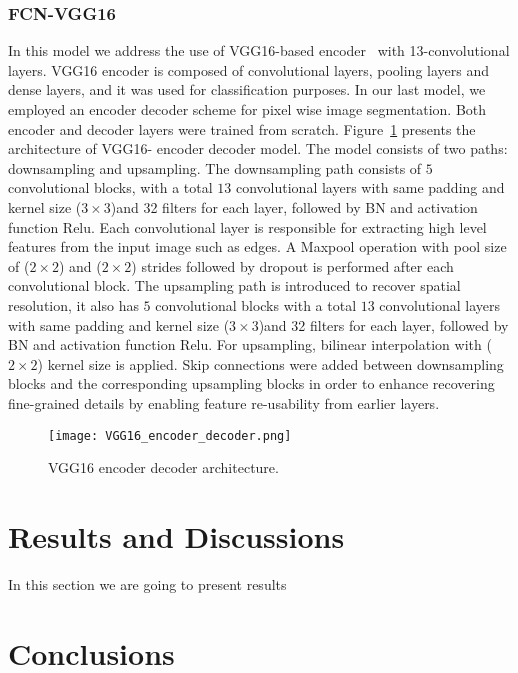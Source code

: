 \documentclass[preprint,9pt]{elsarticle}
\begin{document}
	\subsubsection{FCN-VGG16}
	In this model we address the use of VGG16-based encoder~\cite{Simonyan2015} with 13-convolutional layers.
	VGG16 encoder is composed of convolutional layers, pooling layers and dense layers, and it was used for classification purposes. 
	In our last model, we employed an encoder decoder scheme for pixel wise image segmentation. 
	Both encoder and decoder layers were trained from scratch.
	Figure~\ref{vgg16} presents the architecture of VGG16- encoder decoder model. 
	The model consists of two paths: downsampling and upsampling.
	The downsampling path consists of \(5\) convolutional blocks,  with a total \(13\) convolutional layers  with same padding and kernel size (\(3\times3\))and 32 filters for each layer, followed by BN and activation function Relu.
	Each convolutional layer is responsible for extracting high level features from the input image such as edges.
	A Maxpool operation with pool size of (\(2\times2\))  and (\(2\times2\)) strides followed by dropout is performed after each convolutional block. 
	The upsampling path is introduced to recover spatial resolution, it also has \(5\) convolutional blocks with a total \(13\) convolutional layers  with same padding and kernel size (\(3\times3\))and 32 filters for each layer, followed by BN and activation function Relu.
	For upsampling, bilinear interpolation with (\(2\times2\)) kernel size is applied.
	Skip connections were added between downsampling blocks and the corresponding upsampling blocks in order to enhance recovering fine-grained details by enabling feature re-usability from earlier layers.
	\begin{figure} [h!]
		\begin{center}
			\texttt{[image: VGG16\_encoder\_decoder.png]}
		\end{center}
		\caption{VGG16 encoder decoder architecture.} 
		\label{vgg16}
	\end{figure}

	\section{Results and Discussions}
	In this section we are going to present results

	\section{Conclusions}



	\section*{}

	
	\section*{ }
	
	
	
	
\end{document}

